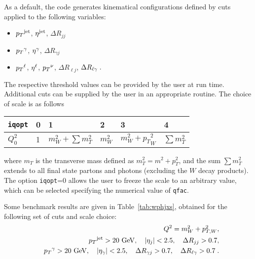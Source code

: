 \documentclass[paper]{JHEP3}
\newcommand{\gev}{\mbox{GeV}}
\def    \ba             {\begin{eqnarray}}
\def    \ea             {\end{eqnarray}}
\def    \gev            {\mbox{$\mathrm{GeV}$}}
\def    \mWsq             {\mbox{$m_W^2$} }
\def    \pt             {\mbox{$p_T$}}
\def    \ptsq           {\mbox{$p^2_T$}}
\def    \ptWsq           {\mbox{$p^2_{T,W}$}}
\def    \mT             {\mbox{$m_T$}}
\def    \mTsq           {\mbox{$m^2_T$}}
\begin{document}
As a default, the code generates kinematical configurations defined by
cuts applied to the following variables:
\begin{itemize}
\item $\pt^{\rm jet}$, $\eta^{\rm jet}$, $\Delta R_{jj}$
\item $\pt^{\rm \gamma}$, $\eta^{\rm \gamma}$, $\Delta R_{\gamma j}$ 
\item $\pt^{\rm \ell}$, $\eta^{\rm \ell}$, $\pt^{\rm \nu}$, $\Delta
  R_{\ell j}$, $\Delta R_{\ell \rm \gamma}  \; . $
\end{itemize}
The respective threshold values can be provided by the user at run
time. Additional cuts can be supplied by the user in an appropriate
routine. 
The choice of scale is as follows
{\renewcommand{\arraystretch}{1.2}
\begin{center}
\begin{tabular}{l||l|l|l|l|l|}
{\tt iqopt} & 0 & 1 & 2 & 3 & 4 \\  \hline
$Q_0^2$ & 1 & $m_W^2+ \sum \mTsq$ & $m_W^2$ & $m_W^2+\pt_W^2$ & $\sum \mTsq$ 
\end{tabular}
\end{center}
}
where $\mT$ is the transverse mass defined as $\mTsq=m^2+\ptsq$,
and the sum $\sum \mTsq $ extends to all final
state partons and photons (excluding the $W$ decay products).
The option  {\tt iqopt}=0 allows the user to freeze the scale to an
arbitrary value, which can be selected specifying the numerical value
of {\tt qfac}.   

Some benchmark results are given in Table~\ref{tab:wphjxs}, obtained
for the following set of cuts and scale choice:
\ba \label{eq:wphj1}
&& Q^2 = \mWsq + \ptWsq,
\\
        && \pt^{\rm jet}>20~\gev, \quad \vert \eta_j\vert < 2.5, \quad \Delta
        R_{jj} >0.7, 
\\
        && \pt^{\rm \gamma}>20~\gev, \quad \vert \eta_\gamma\vert 
< 2.5, \quad \Delta
        R_{\gamma j} >0.7, \quad \Delta
        R_{\ell \gamma} >0.7 \; .
\label{eq:wphj2}
\ea
\end{document}
